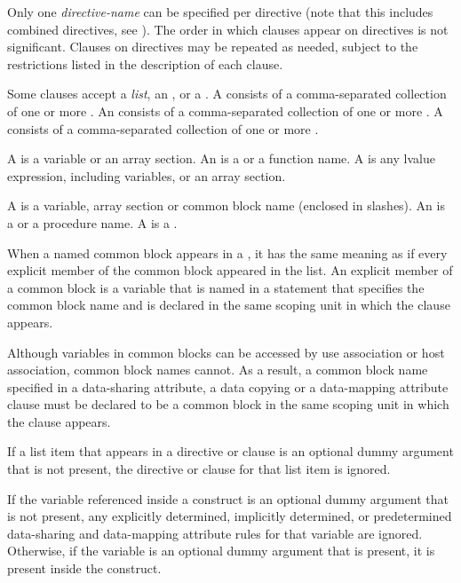 Only one \emph{directive-name} can be specified per directive (note that this 
includes combined directives, see ). The order 
in which clauses appear on directives is not significant. Clauses on directives 
may be repeated as needed, subject to the restrictions listed in the description 
of each clause.

Some clauses accept a \emph{list}, an , or a .  
A  consists of a comma-separated collection of one or more . 
An  consists of a comma-separated collection of one or more
. A  consists of a comma-separated
collection of one or more .

\begin{ccppspecific}
A  is a variable or an array section. An  is
a  or a function name.  A  is any lvalue
expression, including variables, or an array section.
\end{ccppspecific}

\begin{fortranspecific}
A  is a variable, array section or common block name
(enclosed in slashes). An  is a 
or a procedure name. A  is a .

When a named common block appears in a , it has the same
meaning as if every explicit member of the common block appeared in
the list.  An explicit member of a common block is a variable that is
named in a  statement that specifies the common block
name and is declared in the same scoping unit in which the clause
appears.

Although variables in common blocks can be accessed by use association
or host association, common block names cannot.  As a result, a common
block name specified in a data-sharing attribute, a data copying or
a data-mapping attribute clause must be declared to be a common block in
the same scoping unit in which the clause appears.

If a list item that appears in a directive or clause is an optional
dummy argument that is not present, the directive or clause for that
list item is ignored.

If the variable referenced inside a construct is an optional dummy
argument that is not present, any explicitly determined, implicitly
determined, or predetermined data-sharing and data-mapping attribute
rules for that variable are ignored.  Otherwise, if the variable is an
optional dummy argument that is present, it is present inside the
construct.
\end{fortranspecific}

